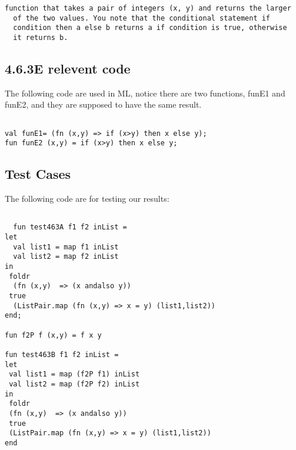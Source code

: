 \documentclass{report}
\begin{document}
\lstset{frameround=ffff}
\begin{lstlisting}[frame=trbl]
  function that takes a pair of integers (x, y) and returns the larger
  of the two values. You note that the conditional statement if
  condition then a else b returns a if condition is true, otherwise
  it returns b.
\end{lstlisting}
\subsection{4.6.3E relevent code}
\label{sec:4.6.3e-relevent-code}



The following code are used in ML, notice there are two functions, funE1 and funE2, and they are supposed to have the same result.
\lstset{frameround=tttt}
\begin{lstlisting}[frame=TRBL]

val funE1= (fn (x,y) => if (x>y) then x else y);
fun funE2 (x,y) = if (x>y) then x else y;
\end{lstlisting}


\subsection{Test Cases}
\label{sec:test-cases}


The following code are for testing our results:

\lstset{frameround=fftt}
\begin{lstlisting}[frame=tRBL]

  fun test463A f1 f2 inList =
let
  val list1 = map f1 inList
  val list2 = map f2 inList
in
 foldr
  (fn (x,y)  => (x andalso y))
 true
  (ListPair.map (fn (x,y) => x = y) (list1,list2))
end;

fun f2P f (x,y) = f x y

fun test463B f1 f2 inList =
let
 val list1 = map (f2P f1) inList
 val list2 = map (f2P f2) inList
in
 foldr
 (fn (x,y)  => (x andalso y))
 true
 (ListPair.map (fn (x,y) => x = y) (list1,list2))
end
\end{lstlisting}
\end{document}
